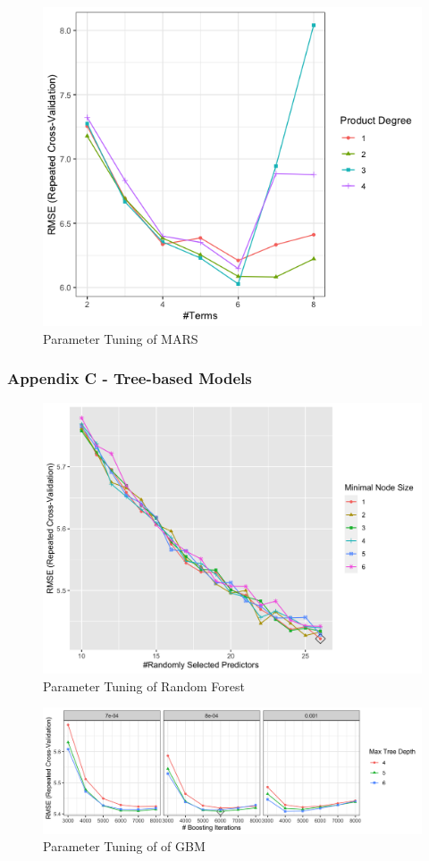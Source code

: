 \documentclass[
]{article}
\begin{document}
\begin{figure}
\centering
\includegraphics{report_figures/appendixB_figure3.png}
\caption{Parameter Tuning of MARS}
\end{figure}

\newpage

\hypertarget{appendix-c---tree-based-models}{%
\subsubsection{Appendix C - Tree-based
Models}\label{appendix-c---tree-based-models}}

\begin{figure}
\centering
\includegraphics{report_figures/appendixC_figure2.png}
\caption{Parameter Tuning of Random Forest}
\end{figure}

\begin{figure}
\centering
\includegraphics{report_figures/appendixC_figure1.png}
\caption{Parameter Tuning of of GBM}
\end{figure}
\end{document}
